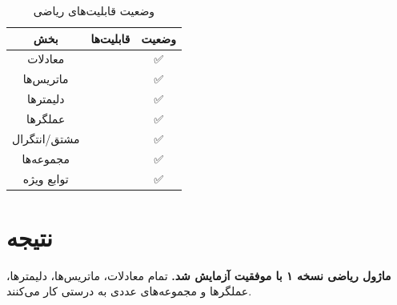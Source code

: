 \documentclass{matinbook}
\begin{document}
    \begin{table}[h]
        \centering
        \caption{وضعیت قابلیت‌های ریاضی}
        \label{tab:math-status}
        \begin{tabular}{|c|C{6cm}|c|}
            \hline
            \textbf{بخش} & \textbf{قابلیت‌ها} & \textbf{وضعیت} \\
            \hline
            معادلات &  & \textcolor{matingreen}{✅} \\
            ماتریس‌ها &  & \textcolor{matingreen}{✅} \\
            دلیمترها &  & \textcolor{matingreen}{✅} \\
            عملگرها &  & \textcolor{matingreen}{✅} \\
            مشتق/انتگرال &  & \textcolor{matingreen}{✅} \\
            مجموعه‌ها &  & \textcolor{matingreen}{✅} \\
            توابع ویژه &  & \textcolor{matingreen}{✅} \\
            \hline
        \end{tabular}
    \end{table}
    
    \section{نتیجه}
    
    \textbf{ماژول ریاضی  نسخه ۱ با موفقیت آزمایش شد.}
    تمام معادلات، ماتریس‌ها، دلیمترها، عملگرها و مجموعه‌های عددی
    به درستی کار می‌کنند. 🎉
    
\end{document}

